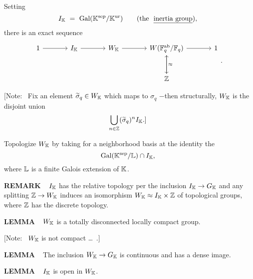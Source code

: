 \vspace{0.1cm}

Setting 
\[
I_\K \ = \ \Gal(\K^\sep / \K^\ur) \qquad (\text{the \un{inertia group}}),
\]
there is an exact sequence
\[
\begin{tikzcd}[sep=large]
{1} \ar{r} 
&{I_\K} \ar{r}
&{W_\K} \ar{r}
&{W(\F_q^\ab / \F_q)} \ar{d} \ar{r}
&{1}\\
&&&{\Z} \ar{u}[swap]{\approx}
\end{tikzcd}
.
\]

\vspace{0.1cm}

[Note: \  Fix an element $\widetilde{\sigma}_q \in W_{\mathbb{K}}$ which maps to $\sigma_q$ $-$then structurally, 
$W_{\mathbb{K}}$ is the disjoint union
\[
\bigcup\limits_{n \in \mathbb{Z}} (\widetilde{\sigma}_q)^n I_{\mathbb{K}}.]
\]

Topologize $W_{\mathbb{K}}$ by taking for a neighborhood basis at the identity the 
\[
\text{Gal}(\mathbb{K}^{\text{sep}} / \mathbb{L}) \cap I_{\mathbb{K}},
\]
where $\mathbb{L}$ is a finite Galois extension of $\mathbb{K}$.

\vspace{0.2cm}

\begin{x}{\small\bf REMARK} \ %
$I_{\mathbb{K}}$ has the relative topology per the inclusion $I_{\mathbb{K}} \rightarrow G_{\mathbb{K}}$ and any splitting 
$\mathbb{Z} \rightarrow W_{\mathbb{K}}$ induces an isomorphism $W_{\mathbb{K}} \approx I_{\mathbb{K}} \times \mathbb{Z}$ of topological groups, 
where $\mathbb{Z}$ has the discrete topology.
\end{x}

\vspace{0.1cm}

\begin{x}{\small\bf LEMMA} \ %
$W_{\mathbb{K}}$ is a totally disconnected locally compact group.

[Note: \ $W_{\mathbb{K}}$ is not compact \ldots \ .]
\end{x}

\vspace{0.1cm}

\begin{x}{\small\bf LEMMA} \ %
The inclusion  $W_{\mathbb{K}} \rightarrow G_{\mathbb{K}}$ is continuous and has a dense image.
\end{x}

\vspace{0.1cm}

\begin{x}{\small\bf LEMMA} \ %
$I_{\mathbb{K}}$ is open in  $W_{\mathbb{K}}$.
\end{x}

